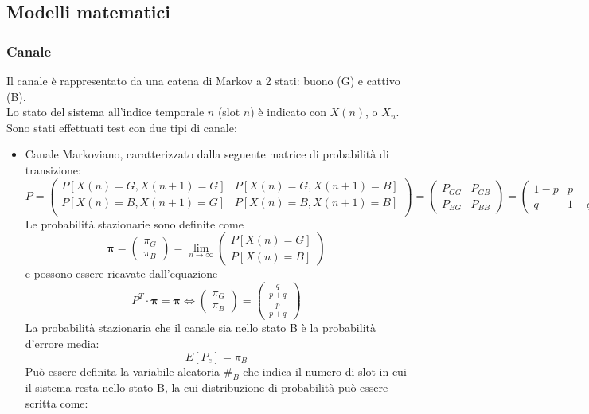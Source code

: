 \documentclass[italian, a4paper, 12pt]{article}
\begin{document}
\subsection{Modelli matematici}
\subsubsection{Canale}
\label{sec:markov}
Il canale è rappresentato da una catena di Markov a 2 stati: buono (G) e cattivo (B).\\
Lo stato del sistema all'indice temporale $n$ (slot $n$) è indicato con $X(n)$, o $X_n$.\\
Sono stati effettuati test con due tipi di canale:
\begin{itemize}
\item Canale Markoviano, caratterizzato dalla seguente matrice di probabilità di transizione:\\
$$P=\begin{pmatrix}
P[X(n)=G, X(n+1)=G] & P[X(n)=G, X(n+1)=B]\\
P[X(n)=B, X(n+1)=G] & P[X(n)=B, X(n+1)=B]\\
\end{pmatrix} = \begin{pmatrix}
P_{GG} & P_{GB} \\
P_{BG} & P_{BB}
\end{pmatrix} =
\begin{pmatrix}
1-p & p \\
q & 1-q
\end{pmatrix}$$
Le probabilità stazionarie sono definite come 
$$\bm{\pi} = \begin{pmatrix}
\pi_G\\\pi_B
\end{pmatrix} = \lim_{n \to\infty} \begin{pmatrix}
P[X(n)=G]\\
P[X(n)=B]
\end{pmatrix}$$
e possono essere ricavate dall'equazione
$$P^T\cdot \bm{\pi} = \bm{\pi} \Leftrightarrow \begin{pmatrix}
\pi_G\\
\pi_B
\end{pmatrix}=
\begin{pmatrix}
\frac{q}{p+q}\\
\frac{p}{p+q}
\end{pmatrix}$$
La probabilità stazionaria che il canale sia nello stato B è la probabilità d'errore media:
$$E[P_e] = \pi_B$$
Può essere definita la variabile aleatoria $\#_B$ che indica il numero di slot in cui il sistema resta nello stato B, la cui distribuzione di probabilità può essere scritta come:

\end{itemize}
\end{document}
